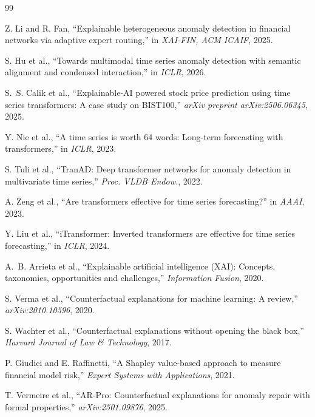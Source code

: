 \documentclass[11pt,a4paper,twoside]{article}
\begin{document}
\clearpage

\begingroup
\setlength{\parskip}{0pt}

\begin{thebibliography}{99}
\setlength{\itemsep}{0pt}

Z. Li and R. Fan,
``Explainable heterogeneous anomaly detection in financial networks via adaptive expert routing,''
in \emph{XAI-FIN, ACM ICAIF}, 2025.

S. Hu et al.,
``Towards multimodal time series anomaly detection with semantic alignment and condensed interaction,''
in \emph{ICLR}, 2026.

S.~S. Calik et al.,
``Explainable-AI powered stock price prediction using time series transformers: A case study on BIST100,''
\emph{arXiv preprint arXiv:2506.06345}, 2025.

Y. Nie et al.,
``A time series is worth 64 words: Long-term forecasting with transformers,''
in \emph{ICLR}, 2023.

S. Tuli et al.,
``TranAD: Deep transformer networks for anomaly detection in multivariate time series,''
\emph{Proc. VLDB Endow.}, 2022.

A. Zeng et al.,
``Are transformers effective for time series forecasting?''
in \emph{AAAI}, 2023.

Y. Liu et al.,
``iTransformer: Inverted transformers are effective for time series forecasting,''
in \emph{ICLR}, 2024.

A.~B. Arrieta et al.,
``Explainable artificial intelligence (XAI): Concepts, taxonomies, opportunities and challenges,''
\emph{Information Fusion}, 2020.

S. Verma et al.,
``Counterfactual explanations for machine learning: A review,''
\emph{arXiv:2010.10596}, 2020.

S. Wachter et al.,
``Counterfactual explanations without opening the black box,''
\emph{Harvard Journal of Law \& Technology}, 2017.

P. Giudici and E. Raffinetti,
``A Shapley value-based approach to measure financial model risk,''
\emph{Expert Systems with Applications}, 2021.

T. Vermeire et al.,
``AR-Pro: Counterfactual explanations for anomaly repair with formal properties,''
\emph{arXiv:2501.09876}, 2025.


\end{thebibliography}
\end{document}
